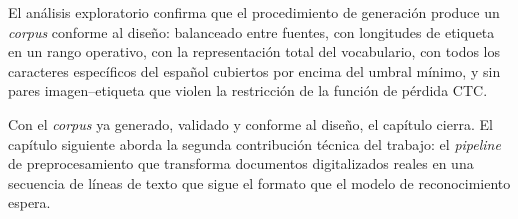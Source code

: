 El análisis exploratorio confirma que el procedimiento de generación produce un \textit{corpus} conforme al diseño: balanceado entre fuentes, con longitudes de etiqueta en un rango operativo, con la representación total del vocabulario, con todos los caracteres específicos del español cubiertos por encima del umbral mínimo, y sin pares imagen--etiqueta que violen la restricción de la función de pérdida CTC.


Con el \textit{corpus} ya generado, validado y conforme al diseño, el capítulo cierra. El capítulo siguiente aborda la segunda contribución técnica del trabajo: el \textit{pipeline} de preprocesamiento que transforma documentos digitalizados reales en una secuencia de líneas de texto que sigue el formato que el modelo de reconocimiento espera.
